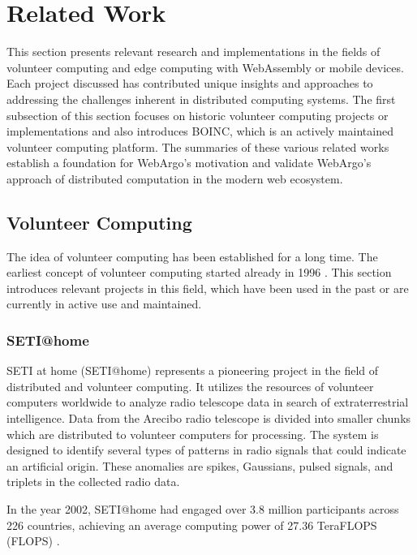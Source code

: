 \section{Related Work}
\label{sec:background:related_work}
This section presents relevant research and implementations in the fields of volunteer computing and edge computing with WebAssembly or mobile devices. Each project discussed has contributed unique insights and approaches to addressing the challenges inherent in distributed computing systems. The first subsection of this section focuses on historic volunteer computing projects or implementations and also introduces \acs{BOINC}, which is an actively maintained volunteer computing platform. The summaries of these various related works establish a foundation for WebArgo's motivation and validate WebArgo's approach of distributed computation in the modern web ecosystem.

\subsection{Volunteer Computing}
The idea of volunteer computing has been established for a long time. The earliest concept of volunteer computing started already in 1996 \cite{relatedwork:boinc1}. This section introduces relevant projects in this field, which have been used in the past or are currently in active use and maintained.

\subsubsection{SETI@home}
\label{subsec:background:related_work:seti}
\ac{SETI} at home (\ac{SETI}@home) represents a pioneering project in the field of distributed and volunteer computing. It utilizes the resources of volunteer computers worldwide to analyze radio telescope data in search of extraterrestrial intelligence. Data from the Arecibo radio telescope is divided into smaller chunks which are distributed to volunteer computers for processing. The system is designed to identify several types of patterns in radio signals that could indicate an artificial origin. These anomalies are spikes, Gaussians, pulsed signals, and triplets in the collected radio data. \cite{relatedwork:seti}

In the year 2002, \ac{SETI}@home had engaged over 3.8 million participants across 226 countries, achieving an average computing power of 27.36 Tera\acs{FLOPS} (\ac{FLOPS}) \cite{relatedwork:seti}.


